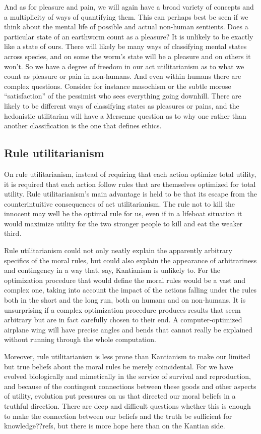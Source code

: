 And as for pleasure and pain, we will again have a broad variety of concepts and a multiplicity of ways of quantifying them.
This can perhaps best be seen if we think about the mental life of possible and actual non-human sentients. Does a particular
state of an earthworm count as a pleasure? It is unlikely to be exactly like a state of ours. There will likely be many ways
of classifying mental states across species, and on some the worm's state will be a pleasure and on others it won't. So we have
a degree of freedom in our act utilitarianism as to what we count as pleasure or pain in non-humans. And even within humans 
there are complex questions. Consider for instance masochism or the subtle morose ``satisfaction'' of the pessimist who sees 
everything going downhill. There are likely to be different ways of classifying states as pleasures or pains, and the hedonistic
utilitarian will have a Mersenne question as to why one rather than another classification is the one that defines ethics.

\subsection{Rule utilitarianism}
On rule utilitarianism, instead of requiring that each action optimize total utility, it is required that each action
follow rules that are themselves optimized for total utility. Rule utilitarianism's main advantage is held to be that
its escape from the counterintuitive consequences of act utilitarianism. The rule not to kill the innocent may well be the
optimal rule for us, even if in a lifeboat situation it would maximize utility for the two stronger people to kill
and eat the weaker third.

Rule utilitarianism could not only neatly explain the
apparently arbitrary specifics of the moral rules, but could also explain the appearance of arbitrariness and contingency
in a way that, say, Kantianism is unlikely to. For the optimization procedure that would define the moral rules would be a vast
and complex one, taking into account the impact of the actions falling under the rules both in the short and the long run, 
both on humans and on non-humans. It is unsurprising if a complex optimization procedure produces results that seem
arbitrary but are in fact carefully chosen to their end. A computer-optimized airplane wing will have precise angles and
bends that cannot really be explained without running through the whole computation.

Moreover, rule utilitarianism is less prone than Kantianism to make our limited but true beliefs about the moral rules be 
merely coincidental. For we have evolved biologically and mimetically in the service of survival and reproduction, and 
because of the contingent connections between these goods and other aspects of utility, evolution put pressures on us 
that directed our moral beliefs in a truthful direction. There are deep and difficult questions whether this is enough
to make the connection between our beliefs and the truth be sufficient for knowledge??refs, but there is more hope here
than on the Kantian side.

